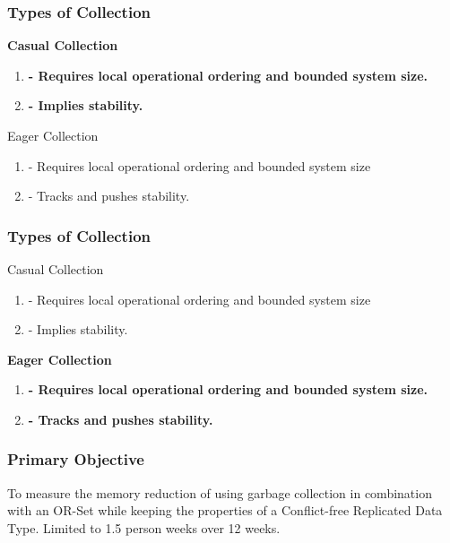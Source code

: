 \documentclass{beamer}
\begin{document}
    \begin{frame}
        \frametitle{Types of Collection}

        \textbf{Casual Collection}
        \begin{enumerate}
            \item \textbf{- Requires local operational ordering and bounded
                system size.}
            \item \textbf{- Implies stability.}
        \end{enumerate}

        Eager Collection
        \begin{enumerate}
            \item - Requires local operational ordering and bounded
                system size
            \item - Tracks and pushes stability.
        \end{enumerate}
    \end{frame}


    \begin{frame}
        \frametitle{Types of Collection}
        Casual Collection
        \begin{enumerate}
            \item - Requires local operational ordering and bounded
                system size
            \item - Implies stability.
        \end{enumerate}

        \textbf{Eager Collection}
        \begin{enumerate}
            \item \textbf{- Requires local operational ordering and bounded
                system size.}
            \item \textbf{- Tracks and pushes stability.}
        \end{enumerate}
    \end{frame}


    \begin{frame}[shrink]
        \frametitle{Primary Objective}
        \begin{center}
        \begin{minipage}{4in}
         To measure the memory reduction of using garbage collection in
         combination with an OR-Set while keeping the properties of a
         Conflict-free Replicated Data Type. Limited to 1.5 person
         weeks over 12 weeks.
        \end{minipage}
        \end{center}
    \end{frame}
\end{document}
